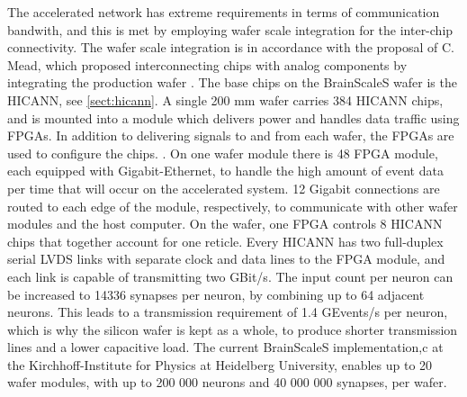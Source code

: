 The accelerated network has extreme requirements in terms of communication bandwith, and this is met by employing wafer scale integration for the inter-chip connectivity\cite{zoschke_full_2017}.
The wafer scale integration is in accordance with the proposal of C. Mead, which proposed interconnecting chips with analog components by integrating the production wafer \cite{mead_neuromorphic_1990}.
The base chips on the BrainScaleS wafer is the HICANN, see \vref{sect:hicann}.
A single 200 mm wafer carries 384 HICANN chips, and is mounted into a module which delivers power and handles data traffic using FPGAs.
In addition to delivering signals to and from each wafer, the FPGAs are used to configure the chips. \cite{zoschke_full_2017}.
On one wafer module there is 48 FPGA module, each equipped with Gigabit-Ethernet, to handle the high amount of event data per time that will occur on the accelerated system.
12 Gigabit connections are routed to each edge of the module, respectively, to communicate with other wafer modules and the host computer.
On the wafer, one FPGA controls 8 HICANN chips that together account for one reticle.
Every HICANN has two full-duplex serial LVDS links with separate clock and data lines to the FPGA module, and each link is capable of transmitting two GBit/s.
The input count per neuron can be increased to 14336 synapses per neuron, by combining up to 64 adjacent neurons.
This leads to a transmission requirement of 1.4 GEvents/s per neuron, which is why the silicon wafer is kept as a whole, to produce shorter transmission lines and a lower capacitive load.
The current BrainScaleS implementation,c at the Kirchhoff-Institute for Physics at Heidelberg University, enables up to 20 wafer modules, with up to 200 000 neurons and 40 000 000 synapses, per wafer.
\cite{zoschke_full_2017}

